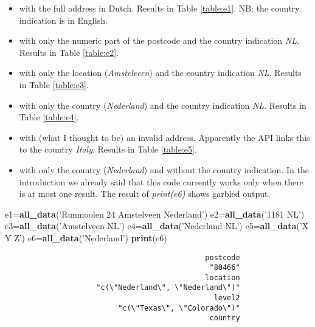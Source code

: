 \documentclass[]{article}
\newenvironment{Shaded}{\begin{snugshade}}{\end{snugshade}}
\newcommand{\KeywordTok}[1]{\textcolor[rgb]{0.13,0.29,0.53}{\textbf{{#1}}}}
\newcommand{\StringTok}[1]{\textcolor[rgb]{0.31,0.60,0.02}{{#1}}}
\newcommand{\NormalTok}[1]{{#1}}
\providecommand{\tightlist}{%
  \setlength{\itemsep}{0pt}\setlength{\parskip}{0pt}}
\newcommand{\mytextit}[1]{\textit{#1}}
\begin{document}
\begin{itemize}
\tightlist
\item
  with the full address in Dutch. Results in Table \ref{table:e1}. NB:
  the country indication is in English.
\item
  with only the numeric part of the postcode and the country indication
  \mytextit{NL}. Results in Table \ref{table:e2}.
\item
  with only the location (\mytextit{Amstelveen}) and the country
  indication \mytextit{NL}. Results in Table \ref{table:e3}.
\item
  with only the country (\mytextit{Nederland}) and the country
  indication \mytextit{NL}. Results in Table \ref{table:e4}.
\item
  with (what I thought to be) an invalid address. Apparently the API
  links this to the country \mytextit{Italy}. Results in Table
  \ref{table:e5}.
\item
  with only the country (\mytextit{Nederland}) and without the country
  indication. In the introduction we already said that this code
  currently works only when there is at most one result. The result of
  \mytextit{print(e6)} shows garbled output.
\end{itemize}

\begin{Shaded}
\begin{Highlighting}[]
\NormalTok{e1=}\KeywordTok{all_data}\NormalTok{(}\StringTok{'Runmoolen 24 Amstelveen Nederland'}\NormalTok{) }
\NormalTok{e2=}\KeywordTok{all_data}\NormalTok{(}\StringTok{'1181 NL'}\NormalTok{) }
\NormalTok{e3=}\KeywordTok{all_data}\NormalTok{(}\StringTok{'Amstelveen NL'}\NormalTok{) }
\NormalTok{e4=}\KeywordTok{all_data}\NormalTok{(}\StringTok{'Nederland NL'}\NormalTok{) }
\NormalTok{e5=}\KeywordTok{all_data}\NormalTok{(}\StringTok{'X Y Z'}\NormalTok{)}
\NormalTok{e6=}\KeywordTok{all_data}\NormalTok{(}\StringTok{'Nederland'}\NormalTok{)}
\KeywordTok{print}\NormalTok{(e6)}
\end{Highlighting}
\end{Shaded}

\begin{verbatim}
                                              postcode 
                                               "80466" 
                                              location 
                     "c(\"Nederland\", \"Nederland\")" 
                                                level2 
                          "c(\"Texas\", \"Colorado\")" 
                                               country 
\end{verbatim}
\end{document}
